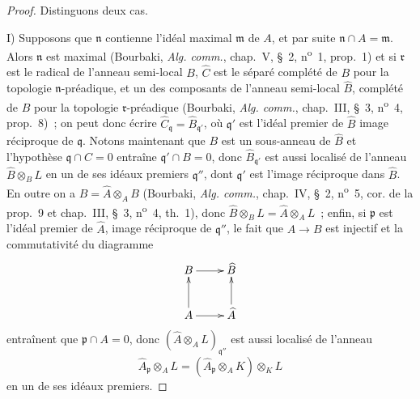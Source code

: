 \begin{proof}
Distinguons deux cas.

I) Supposons que $\mathfrak n$ contienne l'idéal maximal $\mathfrak m$ de
$A$, et par suite $\mathfrak n\cap A=\mathfrak m$. Alors $\mathfrak n$ est
maximal (Bourbaki, \emph{Alg. comm.}, chap.~V, §~2,
n\textsuperscript{o}~1, prop.~1) et si $\mathfrak r$ est le radical de
l'anneau semi-local $B$, $\widehat C$ est le séparé complété de $B$ pour la
topologie $\mathfrak n$-préadique, et un des composants de l'anneau
semi-local $\widehat B$, complété de $B$ pour la topologie
$\mathfrak r$-préadique (Bourbaki, \emph{Alg. comm.}, chap.~III, §~3,
n\textsuperscript{o}~4, prop.~8)~; on peut donc écrire
$\widehat C_\mathfrak q=\widehat B_{\mathfrak q'}$, où $\mathfrak q'$ est
l'idéal premier de $\widehat B$ image réciproque de $\mathfrak q$. Notons
maintenant que $B$ est un sous-anneau de $\widehat B$ et l'hypothèse
$\mathfrak q\cap C=0$ entraîne $\mathfrak q'\cap B=0$, donc
$\widehat B_{\mathfrak q'}$ est aussi localisé de l'anneau
$\widehat B\otimes_B L$ en un de ses idéaux premiers $\mathfrak q''$, dont
$\mathfrak q'$ est l'image réciproque dans $\widehat B$. En outre on a
$\widehat B=\widehat A\otimes_A B$ (Bourbaki, \emph{Alg. comm.}, chap.~IV,
§~2, n\textsuperscript{o}~5, cor. de la prop.~9 et chap.~III, §~3,
n\textsuperscript{o}~4, th.~1), donc
$\widehat B\otimes_B L=\widehat A\otimes_A L$~; enfin, si $\mathfrak p$ est
l'idéal premier de $\widehat A$, image réciproque de $\mathfrak q''$, le
fait que $A\to B$ est injectif et la commutativité du diagramme
\[
  \xymatrix{
    B \ar[r] & \widehat B\\
    A \ar[u] \ar[r] & \widehat A \ar[u]
  }
\]
entraînent que $\mathfrak p\cap A=0$, donc
$(\widehat A\otimes_A L)_{\mathfrak q''}$ est aussi localisé de l'anneau
\[
  \widehat A_\mathfrak p\otimes_A L
  =(\widehat A_\mathfrak p\otimes_A K)\otimes_K L
\]
en un de ses idéaux premiers.



\end{proof}
